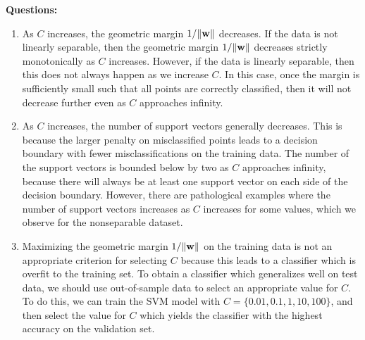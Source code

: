{\bf Questions:}
\begin{enumerate}[label=(\alph*)]
	\item As $C$ increases, the geometric margin $1/\|\boldsymbol{\mathbf{w}}\|$ decreases.  If the data is not linearly separable, then
	the geometric margin $1/\|\boldsymbol{\mathbf{w}}\|$ decreases strictly monotonically as $C$ increases.  However, if the data is linearly
	separable, then this does not always happen as we increase $C$.  In this case, once the margin is sufficiently small
	such that all points are correctly classified, then it will not decrease further even as $C$ approaches infinity.  
	
	\item As $C$ increases, the number of support vectors generally decreases.  This is because the larger penalty on misclassified
	points leads to a decision boundary with fewer misclassifications on the training data.  The number of the
	support vectors is bounded below by two as $C$ approaches infinity, because there will always be at least one support vector
	on each side of the decision boundary.  However, there are pathological examples where the number of support vectors increases as $C$ increases for some values, which we observe for the nonseparable dataset.  
	
	\item Maximizing the geometric margin $1/\|\boldsymbol{\mathbf{w}}\|$ on the training data is not an appropriate criterion for selecting
	$C$ because this leads to a classifier which is overfit to the training set.  To obtain a classifier which generalizes well
	on test data, we should use out-of-sample data to select an appropriate value for $C$.  To do this, we can train the SVM model
	with $C = \{0.01,0.1,1,10,100\}$, and then select the value for $C$ which yields the classifier with the highest
	accuracy on the validation set.  

\end{enumerate}


